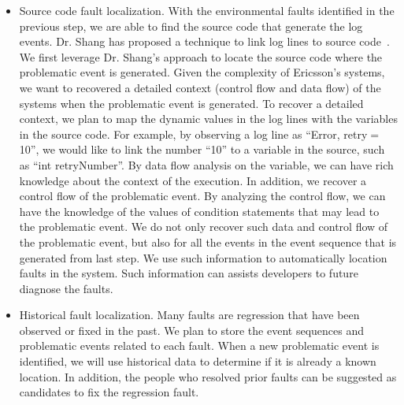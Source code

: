 \begin{enumerate}
\begin{itemize}
		\item {} Source code fault localization. With the environmental faults identified in the previous step, we are able to find the source code that generate the log events. Dr. Shang has proposed a technique to link log lines to source code~\cite{Shang:2014:ULL:2705615.2706065}. We first leverage Dr. Shang's approach to locate the source code where the problematic event is generated. Given the complexity of Ericsson's systems, we want to recovered a detailed context (control flow and data flow) of the systems when the problematic event is generated. To recover a detailed context, we plan to map the dynamic values in the log lines with the variables in the source code. For example, by observing a log line as ``Error, retry$=$10'', we would like to link the number ``10'' to a variable in the source, such as ``int retryNumber''. By data flow analysis on the variable, we can have rich knowledge about the context of the execution. In addition, we recover a control flow of the problematic event. By analyzing the control flow, we can have the knowledge of the values of condition statements that may lead to the problematic event. We do not only recover such data and control flow of the problematic event, but also for all the events in the event sequence that is generated from last step. We use such information to automatically location faults in the system. Such information can assists developers to future diagnose the faults.
		
		\item Historical fault localization. Many faults are regression that have been observed or fixed in the past. We plan to store the event sequences and problematic events related to each fault. When a new problematic event is identified, we will use historical data to determine if it is already a known location. In addition, the people who resolved prior faults can be suggested as candidates to fix the regression fault.
		
	\end{itemize}
\end{enumerate}



